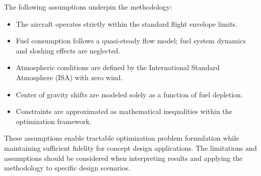 The following assumptions underpin the methodology:

\begin{itemize} 
\item The aircraft operates strictly within the standard flight envelope limits. 
\item Fuel consumption follows a quasi-steady flow model; fuel system dynamics and sloshing effects are neglected. 
\item Atmospheric conditions are defined by the International Standard Atmosphere (ISA) with zero wind. 
\item Center of gravity shifts are modeled solely as a function of fuel depletion. 
\item Constraints are approximated as mathematical inequalities within the optimization framework. \end{itemize}

These assumptions enable tractable optimization problem formulation while maintaining sufficient fidelity for concept design applications. The limitations and assumptions should be considered when interpreting results and applying the methodology to specific design scenarios.

